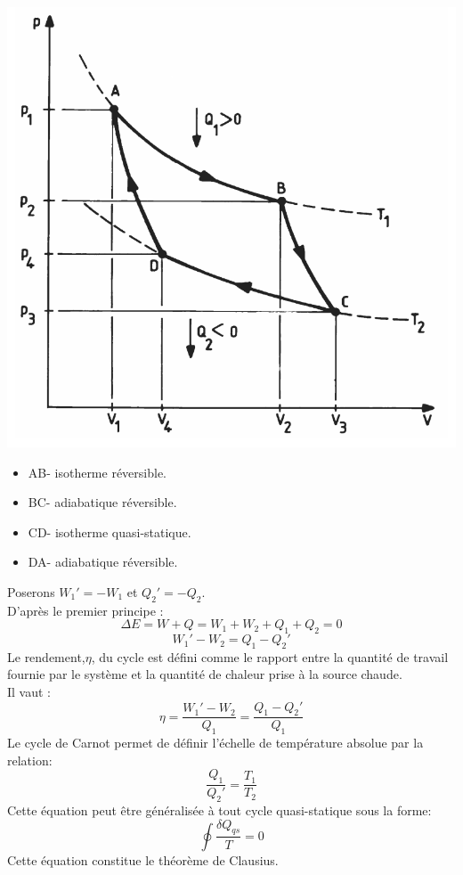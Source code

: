 \documentclass[12pt,oneside]{book}
\begin{document}
\begin{minipage}{0.5\linewidth}
	\includegraphics[width=\linewidth]{../pic/3306/2}
\end{minipage}
\begin{minipage}{0.5\linewidth}
	\begin{itemize}
		\item AB- isotherme réversible.
		\item BC- adiabatique réversible.
		\item CD- isotherme quasi-statique.
		\item DA- adiabatique réversible.
	\end{itemize}
\end{minipage}
Poserons $W_1' = -W_1$ et $Q_2' = -Q_2$.\\
D'après le premier principe :
\[\Delta E = W + Q = W_1 + W_2 + Q_1 + Q_2 = 0\]
\[W_1' - W_2 = Q_1 - Q_2'\]
Le rendement,$\eta$, du cycle est défini comme le rapport entre la quantité de travail fournie par le système et la quantité de chaleur prise à la source chaude.\\
Il vaut :
\[\eta = \frac{W_1' - W_2}{Q_1} = \frac{Q_1 - Q_2'}{Q_1} \]
Le cycle de Carnot permet de définir l'échelle de température absolue par la relation:
\[ \frac{Q_1}{Q_2'} = \frac{T_1}{T_2} \]
Cette équation peut être généralisée à tout cycle quasi-statique sous la forme:
\[ \oint \frac{\delta Q_{qs}}{T} = 0 \]
Cette équation constitue le théorème de Clausius.
\end{document}
